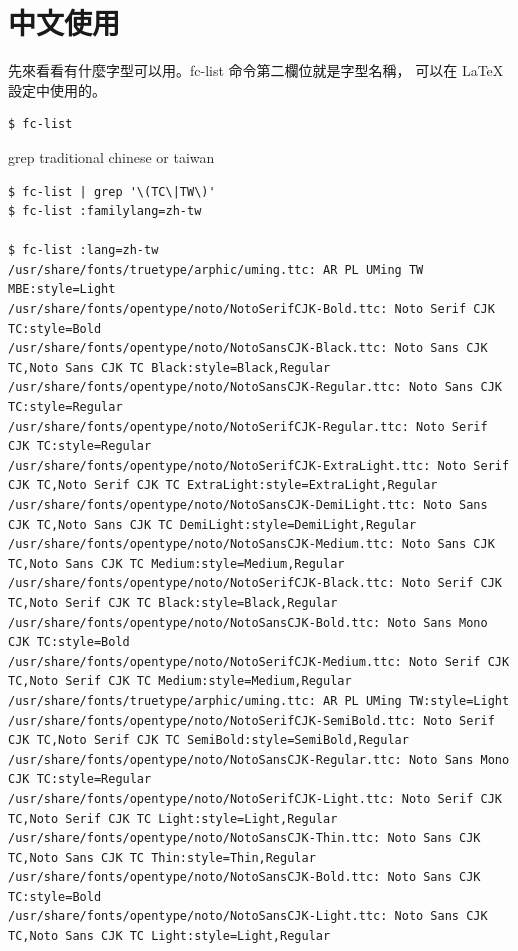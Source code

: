 \section{中文使用}
先來看看有什麼字型可以用。fc-list 命令第二欄位就是字型名稱，
可以在 \LaTeX{} 設定中使用的。
\begin{verbatim}
$ fc-list 
\end{verbatim}
grep traditional chinese or taiwan
\begin{scriptsize}
\begin{verbatim}
$ fc-list | grep '\(TC\|TW\)'
$ fc-list :familylang=zh-tw

$ fc-list :lang=zh-tw
/usr/share/fonts/truetype/arphic/uming.ttc: AR PL UMing TW MBE:style=Light
/usr/share/fonts/opentype/noto/NotoSerifCJK-Bold.ttc: Noto Serif CJK TC:style=Bold
/usr/share/fonts/opentype/noto/NotoSansCJK-Black.ttc: Noto Sans CJK TC,Noto Sans CJK TC Black:style=Black,Regular
/usr/share/fonts/opentype/noto/NotoSansCJK-Regular.ttc: Noto Sans CJK TC:style=Regular
/usr/share/fonts/opentype/noto/NotoSerifCJK-Regular.ttc: Noto Serif CJK TC:style=Regular
/usr/share/fonts/opentype/noto/NotoSerifCJK-ExtraLight.ttc: Noto Serif CJK TC,Noto Serif CJK TC ExtraLight:style=ExtraLight,Regular
/usr/share/fonts/opentype/noto/NotoSansCJK-DemiLight.ttc: Noto Sans CJK TC,Noto Sans CJK TC DemiLight:style=DemiLight,Regular
/usr/share/fonts/opentype/noto/NotoSansCJK-Medium.ttc: Noto Sans CJK TC,Noto Sans CJK TC Medium:style=Medium,Regular
/usr/share/fonts/opentype/noto/NotoSerifCJK-Black.ttc: Noto Serif CJK TC,Noto Serif CJK TC Black:style=Black,Regular
/usr/share/fonts/opentype/noto/NotoSansCJK-Bold.ttc: Noto Sans Mono CJK TC:style=Bold
/usr/share/fonts/opentype/noto/NotoSerifCJK-Medium.ttc: Noto Serif CJK TC,Noto Serif CJK TC Medium:style=Medium,Regular
/usr/share/fonts/truetype/arphic/uming.ttc: AR PL UMing TW:style=Light
/usr/share/fonts/opentype/noto/NotoSerifCJK-SemiBold.ttc: Noto Serif CJK TC,Noto Serif CJK TC SemiBold:style=SemiBold,Regular
/usr/share/fonts/opentype/noto/NotoSansCJK-Regular.ttc: Noto Sans Mono CJK TC:style=Regular
/usr/share/fonts/opentype/noto/NotoSerifCJK-Light.ttc: Noto Serif CJK TC,Noto Serif CJK TC Light:style=Light,Regular
/usr/share/fonts/opentype/noto/NotoSansCJK-Thin.ttc: Noto Sans CJK TC,Noto Sans CJK TC Thin:style=Thin,Regular
/usr/share/fonts/opentype/noto/NotoSansCJK-Bold.ttc: Noto Sans CJK TC:style=Bold
/usr/share/fonts/opentype/noto/NotoSansCJK-Light.ttc: Noto Sans CJK TC,Noto Sans CJK TC Light:style=Light,Regular
\end{verbatim}
\end{scriptsize}
